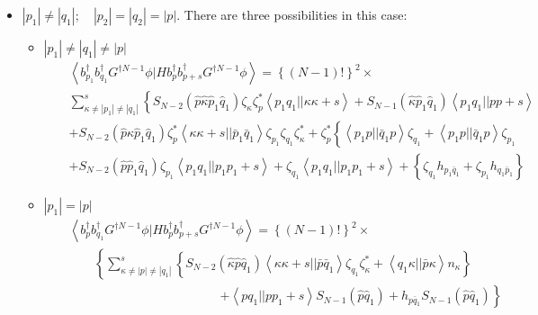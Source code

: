 \begin{itemize}
\item $\left| p_{1}\right| \neq \left| q_{1}\right| ;\quad \left|
p_{2}\right| =\left| q_{2}\right| =\left| p\right| $. There are three
possibilities in this case:

\begin{itemize}
\item $\left| p_{1}\right| \neq \left| q_{1}\right| \neq \left| p\right| $%
\begin{eqnarray}
&&\left\langle b_{p_{1}}^{\dagger }b_{q_{1}}^{\dagger }G^{\dagger N-1}\phi
|Hb_{p}^{\dagger }b_{p+s}^{\dagger }G^{\dagger N-1}\phi \right\rangle
=\left\{ \left( N-1\right) !\right\} ^{2}\times  \nonumber \\
&&\sum_{\kappa \neq \left| p_{1}\right| \neq \left| q_{1}\right|
}^{s}\left\{ S_{N-2}\left( \hat{p}\hat{\kappa}\hat{p}_{1}\hat{q}_{1}\right)
\zeta _{\kappa }\zeta _{p}^{\ast }\left\langle p_{1}q_{1}||\kappa \kappa
+s\right\rangle +S_{N-1}\left( \hat{\kappa}\hat{p}_{1}\hat{q}_{1}\right)
\left\langle p_{1}q_{1}||pp+s\right\rangle \right.  \nonumber \\
&&+S_{N-2}\left( \hat{p}\hat{\kappa}\hat{p}_{1}\hat{q}_{1}\right) \zeta
_{p}^{\ast }\left\langle \kappa \kappa +s||\bar{p}_{1}\bar{q}%
_{1}\right\rangle \zeta _{p_{1}}\zeta _{q_{1}}\zeta _{\kappa }^{\ast }+\zeta
_{p}^{\ast }\left\{ \left\langle p_{1}p||\bar{q}_{1}p\right\rangle \zeta
_{q_{1}}+\left\langle p_{1}p||\bar{q}_{1}p\right\rangle \zeta _{p_{1}}\right.
\nonumber \\
&&+S_{N-2}\left( \hat{p}\hat{p}_{1}\hat{q}_{1}\right) \zeta
_{p_{1}}\left\langle p_{1}q_{1}||p_{1}p_{1}+s\right\rangle +\zeta
_{q_{1}}\left\langle p_{1}q_{1}||p_{1}p_{1}+s\right\rangle +\left\{ \zeta
_{q_{1}}h_{p_{1}\bar{q}_{1}}+\zeta _{p_{1}}h_{q_{1}\bar{p}_{1}}\right\}
\end{eqnarray}

\item $\left| p_{1}\right| =\left| p\right| $%
\begin{eqnarray}
&&\left\langle b_{p}^{\dagger }b_{q_{1}}^{\dagger }G^{\dagger N-1}\phi
|Hb_{p}^{\dagger }b_{p+s}^{\dagger }G^{\dagger N-1}\phi \right\rangle
=\left\{ \left( N-1\right) !\right\} ^{2}\times  \nonumber \\
&&\qquad \left\{ \sum_{\kappa \neq \left| p\right| \neq \left| q_{1}\right|
}^{s}\left\{ S_{N-2}\left( \hat{\kappa}\hat{p}\hat{q}_{1}\right)
\left\langle \kappa \kappa +s||\bar{p}\bar{q}_{1}\right\rangle \zeta
_{q_{1}}\zeta _{\kappa }^{\ast }+\left\langle q_{1}\kappa ||\bar{p}\kappa
\right\rangle n_{\kappa }\right\} \right.  \nonumber \\
&&\qquad \qquad \qquad \qquad \qquad \qquad \left. +\left\langle
pq_{1}||pp_{1}+s\right\rangle S_{N-1}\left( \hat{p}\hat{q}_{1}\right) +h_{p%
\bar{q}_{1}}S_{N-1}\left( \hat{p}\hat{q}_{1}\right) \right\}
\end{eqnarray}


\end{itemize}
\end{itemize}
